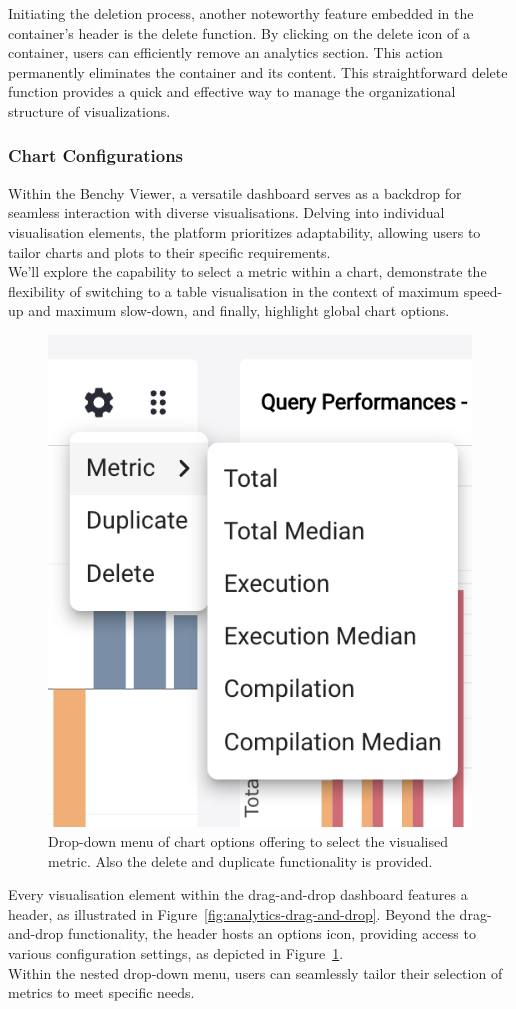 Initiating the deletion process, another noteworthy feature embedded in the container's header is the delete function. By clicking on the delete icon of a container, users can efficiently remove an analytics section. This action permanently eliminates the container and its content. This straightforward delete function provides a quick and effective way to manage the organizational structure of visualizations.


\subsubsection{Chart Configurations}\label{sec:chart-configuration}

Within the Benchy Viewer, a versatile dashboard serves as a backdrop for seamless interaction with diverse visualisations. Delving into individual visualisation elements, the platform prioritizes adaptability, allowing users to tailor charts and plots to their specific requirements.\\
We'll explore the capability to select a metric within a chart, demonstrate the flexibility of switching to a table visualisation in the context of maximum speed-up and maximum slow-down, and finally, highlight global chart options.

\begin{figure}[h]
  \centering
  \includegraphics[width=0.35\linewidth]{figures/chart-configuration.png}
  \caption{Drop-down menu of chart options offering to select the visualised metric. Also the delete and duplicate functionality is provided.}
  \label{fig:chart-configuration}
\end{figure}

Every visualisation element within the drag-and-drop dashboard features a header, as illustrated in Figure~\ref{fig:analytics-drag-and-drop}. Beyond the drag-and-drop functionality, the header hosts an options icon, providing access to various configuration settings, as depicted in Figure~\ref{fig:chart-configuration}.\\
Within the nested drop-down menu, users can seamlessly tailor their selection of metrics to meet specific needs.

